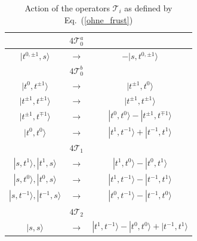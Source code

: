 \begin{table}[bht]{}
\begin{tabular}{|ccc|}
&$4{\mathcal{T}}_{0}^a$&\\
\hline\hline
$|t^{0,\pm1},s\rangle$ & $\longrightarrow$ & 
$-|s,t^{0,\pm1}\rangle$\\
\hline
\hline
&$4{\mathcal{T}}_{0}^b$&\\
\hline\hline
$|t^0,t^{\pm1}\rangle$ & $\longrightarrow$ & 
$|t^{\pm1},t^0\rangle$\\
$|t^{\pm1},t^{\pm1}\rangle$ & $\longrightarrow$ & 
$|t^{\pm1},t^{\pm1}\rangle$\\
$|t^{\pm1},t^{\mp1}\rangle$ & $\longrightarrow$ & 
$|t^0,t^0\rangle-|t^{\pm1},t^{\mp1}\rangle$\\
$|t^0,t^0\rangle$ & $\longrightarrow$ & 
$|t^1,t^{-1}\rangle+|t^{-1},t^1\rangle$\\
\hline
\hline
&$4{\mathcal{T}}_{ 1}$&\\
\hline\hline
$|s,t^{1}\rangle, |t^{1},s\rangle$ & $\longrightarrow$ & 
$|t^{1},t^0\rangle-|t^{0},t^1\rangle$\\
$|s,t^{0}\rangle, |t^{0},s\rangle$ & $\longrightarrow$ & 
$|t^{1},t^{-1}\rangle-|t^{-1},t^1\rangle$\\
$|s,t^{-1}\rangle, |t^{-1},s\rangle$ & $\longrightarrow$ & 
$|t^{0},t^{-1}\rangle-|t^{-1},t^0\rangle$\\
\hline
\hline
&$4{\mathcal{T}}_{ 2}$&\\
\hline\hline
$|s,s\rangle$ & $\longrightarrow$ & 
$|t^{1},t^{-1}\rangle-|t^0,t^0\rangle+|t^{-1},t^1\rangle$
\end{tabular}
\caption{\label{matrix_tab} Action of the operators 
${\mathcal{T}}_{i}$ as defined by Eq.~(\ref{ohne_frust})}
\end{table}



